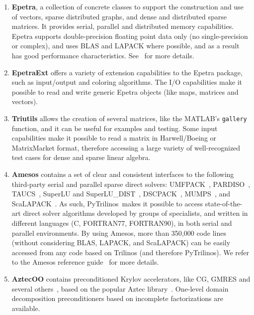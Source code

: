 \documentclass[10pt,relax]{SANDreport}
\newcommand{\PyTrilinos}{{PyTrilinos}}
\begin{document}
\begin{enumerate}

\item {\bf Epetra}, a collection of concrete classes to support the
construction and use of vectors, sparse distributed graphs, and dense and
distributed sparse matrices. It provides serial, parallel and distributed
memory capabilities. Epetra supports double-precision floating point data only
(no single-precision or complex), and uses BLAS and LAPACK where possible, and
as a result has good performance characteristics.  See~\cite{epetra-guide} for
more details. 
\item {\bf EpetraExt} offers a variety of extension capabilities to
  the Epetra package, such as input/output and coloring algorithms.
  The I/O capabilities make it possible to read and write generic
  Epetra objects (like maps, matrices and vectors).

\item {\bf Triutils} allows the creation of several matrices, like the
  MATLAB's {\tt gallery} function, and it can be useful for examples
  and testing. Some input capabilities make it possible to read a matrix in
  Harwell/Boeing or MatrixMarket format, therefore accessing a large variety
  of well-recognized test cases for dense and sparse linear algebra.

\item {\bf Amesos} contains a set of clear and consistent interfaces
  to the following third-party serial and parallel sparse direct
  solvers: UMFPACK~\cite{umfpack-acm-toms},
  PARDISO~\cite{pardiso-manual}, TAUCS~\cite{taucs-home-page}, SuperLU
  and SuperLU\_DIST~\cite{superlu-manual},
  DSCPACK~\cite{dscpack-manual}, MUMPS~\cite{mumps-manual}, and
  ScaLAPACK~\cite{scalapack-book,scalapack}. As
  such, \PyTrilinos\ makes it possible to access state-of-the-art
  direct solver algorithms developed by groups of specialists, and
  written in different languages (C, FORTRAN77, FORTRAN90), in both
  serial and parallel environments. By using Amesos, more than 350,000 code lines (without
  considering BLAS, LAPACK, and ScaLAPACK) can be easily accessed from any
  code based on Trilinos (and therefore PyTrilinos).  We refer to the Amesos
  reference guide~\cite{Amesos-Reference-Guide} for more details.

\item {\bf AztecOO} contains preconditioned Krylov accelerators, like
  CG, GMRES and several others~\cite{golub96matrix}, based on the popular Aztec
  library~\cite{aztecoo-guide}.  One-level domain decomposition
  preconditioners based on incomplete factorizations are available.


\end{enumerate}
\end{document}
